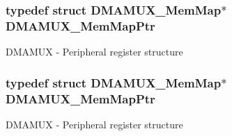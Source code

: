 \subsubsection[{\texorpdfstring{D\+M\+A\+M\+U\+X\+\_\+\+Mem\+Map\+Ptr}{DMAMUX_MemMapPtr}}]{\setlength{\rightskip}{0pt plus 5cm}typedef struct {\bf D\+M\+A\+M\+U\+X\+\_\+\+Mem\+Map}$\ast$ {\bf D\+M\+A\+M\+U\+X\+\_\+\+Mem\+Map\+Ptr}}\hypertarget{group___d_m_a_m_u_x___peripheral_ga736ab5b1ed284b3b4fdb63010a576777}{}\label{group___d_m_a_m_u_x___peripheral_ga736ab5b1ed284b3b4fdb63010a576777}
D\+M\+A\+M\+UX -\/ Peripheral register structure 
\subsubsection[{\texorpdfstring{D\+M\+A\+M\+U\+X\+\_\+\+Mem\+Map\+Ptr}{DMAMUX_MemMapPtr}}]{\setlength{\rightskip}{0pt plus 5cm}typedef struct {\bf D\+M\+A\+M\+U\+X\+\_\+\+Mem\+Map}$\ast$ {\bf D\+M\+A\+M\+U\+X\+\_\+\+Mem\+Map\+Ptr}}\hypertarget{group___d_m_a_m_u_x___peripheral_ga736ab5b1ed284b3b4fdb63010a576777}{}\label{group___d_m_a_m_u_x___peripheral_ga736ab5b1ed284b3b4fdb63010a576777}
D\+M\+A\+M\+UX -\/ Peripheral register structure 